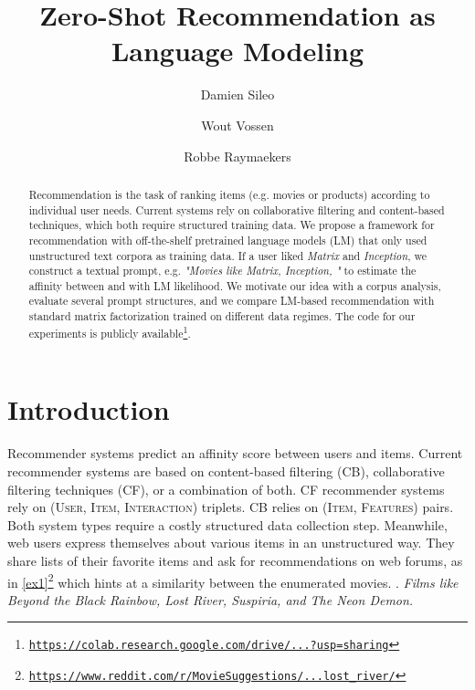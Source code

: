 \documentclass[runningheads]{llncs}
\begin{document}
\title{Zero-Shot Recommendation as Language Modeling}


\author{Damien Sileo \and
Wout Vossen \and
Robbe Raymaekers}







\maketitle

\begin{abstract}
Recommendation is the task of ranking items (e.g. movies or products) according to individual user needs. Current systems rely on collaborative filtering and content-based techniques, which both require structured training data. We propose a framework for recommendation with off-the-shelf pretrained language models (LM) that only used unstructured text corpora as training data. If a user  liked \textit{Matrix} and \textit{Inception}, we construct a textual prompt, e.g. \textit{"Movies like Matrix, Inception, "} to estimate the affinity between   and  with LM likelihood. We motivate our idea with a corpus analysis, evaluate several prompt structures, and we compare LM-based recommendation with standard matrix factorization trained on different data regimes. The code for our experiments is publicly available\footnote{\href{https://colab.research.google.com/drive/1f1mlZ-FGaLGdo5rPzxf3vemKllbh2esT?usp=sharing}{\texttt{https://colab.research.google.com/drive/...?usp=sharing}}}.



\end{abstract}

\section{Introduction}
Recommender systems predict an affinity score between users and items. Current recommender systems are based on content-based filtering (CB),  collaborative filtering techniques (CF), or a combination of both.  CF recommender systems rely on (\textsc{User,  Item,  Interaction}) triplets.  CB relies on (\textsc{Item, Features}) pairs. Both system types require a costly structured data collection step.  Meanwhile, web users  express themselves about various items in an unstructured way. They share lists of their favorite items and ask for recommendations on web forums, as in \ref{ex1}\footnote{\href{https://www.reddit.com/r/MovieSuggestions/comments/cuuwrk/films_like_beyond_the_black_rainbow_lost_river/} {\texttt{https://www.reddit.com/r/MovieSuggestions/...lost\_river/}}} which hints at a similarity between the enumerated movies. 
\ex. \textit{\hspace{-0.3cm} Films like Beyond the Black Rainbow, Lost River, Suspiria, and The Neon Demon. \label{ex1}}
\end{document}
